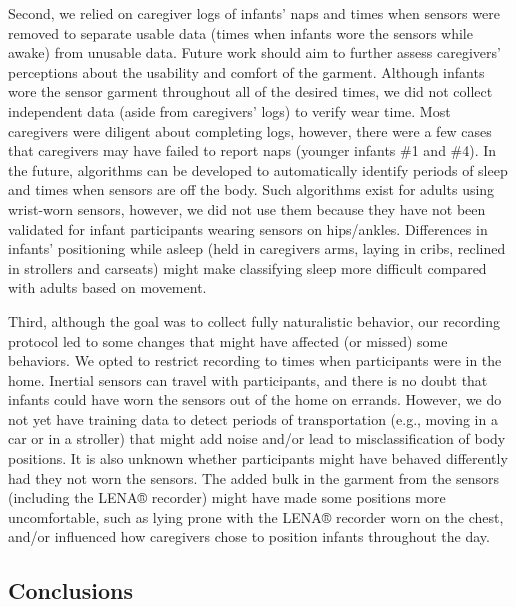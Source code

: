 \documentclass[
  man]{apa6}
\begin{document}
Second, we relied on caregiver logs of infants' naps and times when sensors were removed to separate usable data (times when infants wore the sensors while awake) from unusable data. Future work should aim to further assess caregivers' perceptions about the usability and comfort of the garment. Although infants wore the sensor garment throughout all of the desired times, we did not collect independent data (aside from caregivers' logs) to verify wear time. Most caregivers were diligent about completing logs, however, there were a few cases that caregivers may have failed to report naps (younger infants \#1 and \#4). In the future, algorithms can be developed to automatically identify periods of sleep and times when sensors are off the body. Such algorithms exist for adults using wrist-worn sensors, however, we did not use them because they have not been validated for infant participants wearing sensors on hips/ankles. Differences in infants' positioning while asleep (held in caregivers arms, laying in cribs, reclined in strollers and carseats) might make classifying sleep more difficult compared with adults based on movement.

Third, although the goal was to collect fully naturalistic behavior, our recording protocol led to some changes that might have affected (or missed) some behaviors. We opted to restrict recording to times when participants were in the home. Inertial sensors can travel with participants, and there is no doubt that infants could have worn the sensors out of the home on errands. However, we do not yet have training data to detect periods of transportation (e.g., moving in a car or in a stroller) that might add noise and/or lead to misclassification of body positions. It is also unknown whether participants might have behaved differently had they not worn the sensors. The added bulk in the garment from the sensors (including the LENA® recorder) might have made some positions more uncomfortable, such as lying prone with the LENA® recorder worn on the chest, and/or influenced how caregivers chose to position infants throughout the day.

\hypertarget{conclusions}{%
\subsection{Conclusions}\label{conclusions}}
\end{document}
